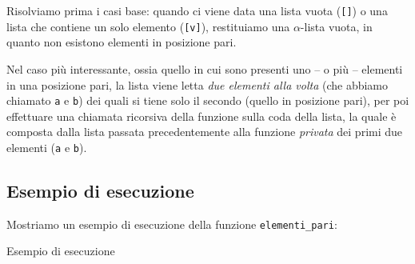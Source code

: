 Risolviamo prima i casi base: quando ci viene data una lista vuota (\texttt{[]}) o una lista che contiene un solo elemento (\texttt{[v]}), restituiamo una \(\alpha\)-lista vuota, in quanto non esistono elementi in posizione pari.

Nel caso più interessante, ossia quello in cui sono presenti uno -- o più -- elementi in una posizione pari, la lista viene letta \emph{due elementi alla volta} (che abbiamo chiamato \texttt{a} e \texttt{b}) dei quali si tiene solo il secondo (quello in posizione pari), per poi effettuare una chiamata ricorsiva della funzione sulla coda della lista, la quale è composta dalla lista passata precedentemente alla funzione \emph{privata} dei primi due elementi (\texttt{a} e \texttt{b}).

\subsection*{Esempio di esecuzione}

Mostriamo un esempio di esecuzione della funzione \texttt{elementi_pari}:

\begin{listing}[!h]
\caption[]{Esempio di esecuzione}
\end{listing}
